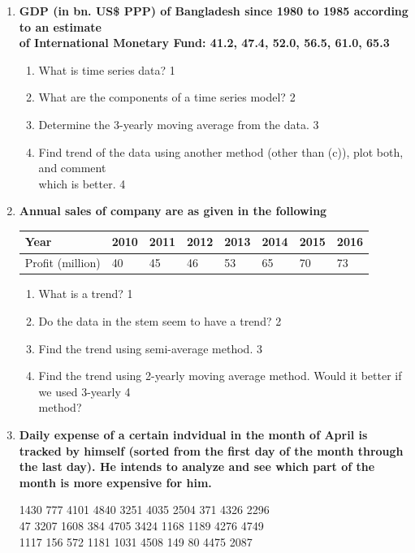 \documentclass[a4paper,oneside]{book}
\begin{document}
\begin{enumerate}
\begin{enumerate}
 \item
	  \textbf{GDP (in bn. US\$ PPP) of Bangladesh since 1980 to 1985 according to an estimate \\ of International  Monetary Fund: 41.2, 47.4, 52.0, 56.5, 61.0, 65.3}
  \begin{enumerate}
    \item
	What is time series data? \hfill 1
    \item
	What are the components of a time series model? \hfill 2
    \item  
	Determine the 3-yearly moving average from the data. \hfill 3
    \item
	Find trend of the data using another method (other than (c)), plot both, and comment \\ which is better. \hfill 4
\end{enumerate}

 \item
	  \textbf{Annual sales of company are as given in the following}\
	  
	  \begin{table}[h]
	  \centering
\begin{tabular}{l|l|l|l|l|l|l|l}
Year & 2010 & 2011 & 2012 & 2013 & 2014 & 2015 & 2016 \\ \hline
Profit (million) & 40 & 45 & 46 & 53 & 65 & 70 & 73
\end{tabular}
\end{table}

  \begin{enumerate}
    \item
	What is a trend? \hfill 1
    \item
	Do the data in the stem seem to have a trend? \hfill 2
    \item  
	Find the trend using semi-average method. \hfill 3
    \item
	Find the trend using 2-yearly moving average method. Would it better if we used 3-yearly  \hfill 4 \\  method?
\end{enumerate}

 \item
	  \textbf{Daily expense of a certain indvidual in the month of April is tracked by himself (sorted from the first day of the month through the last day). He intends to analyze and see which part of the month is more expensive for him.}
	  
	  \begin{center}
1430  777 4101 4840 3251 4035 2504  371 4326 2296 \\
47 3207 1608  384 4705 3424 1168 1189 4276 4749 \\
1117  156  572 1181 1031 4508  149   80 4475 2087
\end{center}
  

\end{enumerate}
\end{enumerate}
\end{document}
